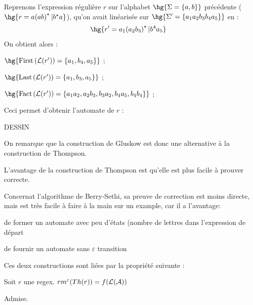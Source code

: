 \documentclass[a4paper,french,bookmarks]{book}
\begin{document}
    \begin{example}{}{}
        Reprenons l'expression régulière $r$ sur l'alphabet $\hg{\Sigma = \ens{a, b}}$ précédente ($\hg{r = a\p{ab}^\star \vert b^\star a}$), qu'on avait linéarisée sur $\hg{\Sigma' = \ens{a_1a_2b_3b_4a_5}}$ en :
        \[ \hg{r' = a_1\p{a_2b_3}^\star \vert b^4a_5 } \]
        On obtient alors :
        \begin{enumerate}
            \itt $\hg{\First{\bcL\p{r'}} = \ens{a_1, b_4, a_5}}$ ;
            
            \itt $\hg{\Last{\bcL\p{r'}} = \ens{a_1, b_3, a_5}}$ ;
            
            \itt $\hg{\Fact{\bcL\p{r'}} = \ens{a_1a_2, a_2b_3, b_3a_2, b_4a_5, b_4b_4}}$ ;
        \end{enumerate}
        Ceci permet d'obtenir l'automate de $r$ :
        \begin{center}
            DESSIN
        \end{center}
    \end{example}
    
    On remarque que la construction de Gluskow est donc une alternative à la 
    construction de Thompson. 
    \begin{enumerate}
        \itt L'avantage de la construction de Thompson est qu'elle est plus facile à prouver correcte. 
        
        
        \itt Concernat l'algorithme de Berry-Sethi, sa preuve de correction est moins directe, mais est très facile à faire à la main sur un example, car il a l'avantage: 
        
        \itt    de former un automate avec peu d'états (nombre de lettres dans l'expression de départ
        
        \itt    de fournir un automate sans $\varepsilon$ transition 
    
    \end{enumerate}
    
    
    
    Ces deux constructions sont liées par la propriété suivante :
    
    
    
    \begin{property}{}{}
        Soit $r$ une regex. $rm^\varepsilon \!\left(Th\!\left(r\right)\right) = f\!\left(\mathcal{L}\!\left(\mathcal{A}\right)\right)$
    \end{property}
    
    \begin{nproof}
        Admise.
    \end{nproof}
    
\end{document}

